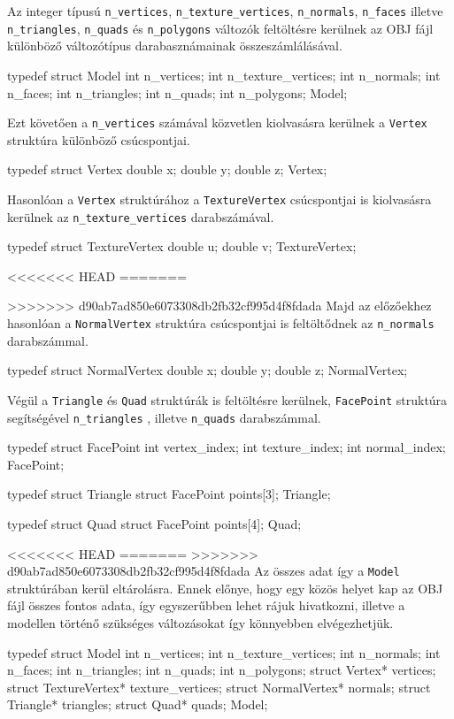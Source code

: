 Az integer típusú \texttt{n\_vertices}, \texttt{n\_texture\_vertices}, \texttt{n\_normals}, \texttt{n\_faces} illetve \texttt{n\_triangles}, \texttt{n\_quads} és \texttt{n\_polygons} változók feltöltésre kerülnek az OBJ fájl különböző változótípus darabasznámainak összeszámlálásával.
\begin{python}
typedef struct Model
{
    int n_vertices;
    int n_texture_vertices;
    int n_normals;
    int n_faces;
    int n_triangles;
    int n_quads;
    int n_polygons;
} Model;
\end{python}

\newpage

\noindent Ezt követően a \texttt{n\_vertices} számával közvetlen kiolvasásra kerülnek a \texttt{Vertex} struktúra különböző csúcspontjai.
\begin{python} 
typedef struct Vertex
{
    double x;
    double y;
    double z;
} Vertex;
\end{python}
Hasonlóan a \texttt{Vertex} struktúrához a \texttt{TextureVertex} csúcspontjai is kiolvasásra kerülnek az \texttt{n\_texture\_vertices} darabszámával.
\begin{python}
typedef struct TextureVertex
{
    double u;
    double v;
} TextureVertex;
\end{python}
<<<<<<< HEAD
=======

\newpage

>>>>>>> d90ab7ad850e6073308db2fb32cf995d4f8fdada
\noindent Majd az előzőekhez hasonlóan a \texttt{NormalVertex}  struktúra csúcspontjai is feltöltődnek az \texttt{n\_normals} darabszámmal.
\begin{python}
typedef struct NormalVertex
{
    double x;
    double y;
    double z;
} NormalVertex;
\end{python}
Végül a \texttt{Triangle} és \texttt{Quad} struktúrák is feltöltésre kerülnek, \texttt{FacePoint} struktúra segítségével \texttt{n\_triangles} , illetve \texttt{n\_quads} darabszámmal.
\begin{python}
typedef struct FacePoint
{
    int vertex_index;
    int texture_index;
    int normal_index;
} FacePoint;

typedef struct Triangle
{
    struct FacePoint points[3];
} Triangle;

typedef struct Quad
{
    struct FacePoint points[4];
} Quad;
\end{python}
<<<<<<< HEAD
\newpage
=======
>>>>>>> d90ab7ad850e6073308db2fb32cf995d4f8fdada
Az összes adat így a \texttt{Model} struktúrában kerül eltárolásra. Ennek előnye, hogy egy közös helyet kap az OBJ fájl összes fontos adata, így egyszerűbben lehet rájuk hivatkozni, illetve a modellen történő szükséges változásokat így könnyebben elvégezhetjük.
\begin{python}
typedef struct Model
{
    int n_vertices;
    int n_texture_vertices;
    int n_normals;
    int n_faces;
    int n_triangles;
    int n_quads;
    int n_polygons;
    struct Vertex* vertices;
    struct TextureVertex* texture_vertices;
    struct NormalVertex* normals;
    struct Triangle* triangles;
    struct Quad* quads;
} Model;
\end{python}

